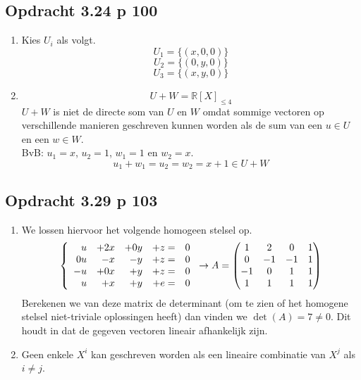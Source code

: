 \documentclass[lineaire_algebra_oplossingen.tex]{subfiles}
\begin{document}
\subsection{Opdracht 3.24 p 100}
\label{3.24}
\begin{enumerate}
\item
Kies $U_i$ als volgt.
$$U_1 = \{(x,0,0)\} $$
$$U_2 =  \{ (0,y,0)\} $$
$$U_3 = \{ (x,y,0)\} $$

\item
\[
U + W = \mathbb{R}[X]_{\le 4}
\]
$U+W$ is niet de directe som van $U$ en $W$ omdat sommige vectoren op verschillende manieren geschreven kunnen worden als de sum van een $u\in U$ en een $w\in W$.\\
BvB:
$u_1 = x$, $u_2 = 1$, $w_1 = 1$ en $w_2 = x$.
\[
u_1 + w_1 = u_2 = w_2 = x+1 \in U+W
\]
\end{enumerate}


\subsection{Opdracht 3.29 p 103}
\label{3.29}
\begin{enumerate}
\item
We lossen hiervoor het volgende homogeen stelsel op.
\[
\left\{
\begin{array}{r r r r r}
u &+ 2x &+ 0y &+ z =& 0\\
0u &- x &- y &+ z =& 0\\
-u &+ 0x &+ y &+z =& 0\\
u &+ x &+ y &+ e =& 0\\
\end{array}
\right.
\rightarrow
A=
\begin{pmatrix}
1 & 2 & 0 & 1\\
0 & -1 & -1 & 1\\
-1 & 0 & 1 & 1\\
1 & 1 & 1 & 1
\end{pmatrix}
\]
Berekenen we van deze matrix de determinant (om te zien of het homogene stelsel niet-triviale oplossingen heeft) dan vinden we $\det(A) = 7\neq 0$.
Dit houdt in dat de gegeven vectoren lineair afhankelijk zijn.

\item
Geen enkele $X^i$ kan geschreven worden als een lineaire combinatie van $X^j$ als $i\neq j$.
\end{enumerate}

\end{document}
